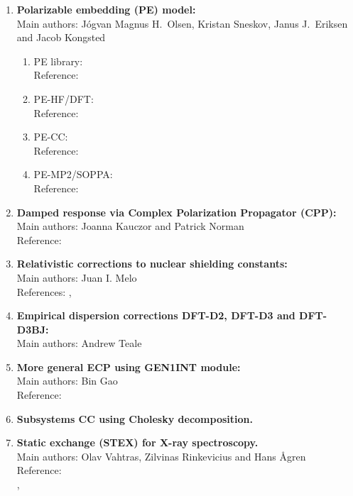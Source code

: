 \begin{enumerate}
\item{\bf  Polarizable embedding (PE) model:}  \\
Main authors: J\'{o}gvan Magnus H.\ Olsen, Kristan Sneskov, Janus J.\ Eriksen and Jacob Kongsted
\begin{enumerate}
  \item{PE library:}  \\
   Reference:  \cite{pelib2012}
  \item{PE-HF/DFT:}  \\
   Reference:  \cite{pescf}
  \item{PE-CC:}  \\
   Reference:  \cite{pecc}
  \item{PE-MP2/SOPPA:}  \\
   Reference:  \cite{pesoppa}
\end{enumerate}
\item{\bf  Damped response via Complex Polarization Propagator (CPP):} \\
Main authors: Joanna Kauczor and Patrick Norman \\
Reference:  \cite{kauczor:2011}
\item{\bf  Relativistic corrections to nuclear shielding constants:}  \\
Main authors: Juan I. Melo \\
 References:   \cite{melojcp03},  \cite{melomaldojcp12}
\item{\bf  Empirical dispersion corrections DFT-D2, DFT-D3 and DFT-D3BJ:}  \\
Main authors: Andrew Teale
\item{\bf  More general ECP using GEN1INT module:} \\
Main authors: Bin Gao \\
 Reference:  \cite{gen1int}
\item{\bf  Subsystems CC using Cholesky decomposition.}
\item{\bf  Static exchange (STEX) for X-ray spectroscopy.} \\
Main authors: Olav Vahtras, Zilvinas Rinkevicius and Hans {\AA}gren\\
Reference:\\
\cite{niskanencppc13},\\
\cite{luopra97}\\

\end{enumerate}
